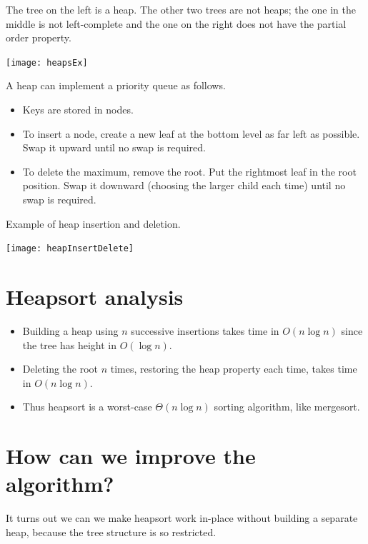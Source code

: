 \begin{Boxample}
The tree on the left is a heap. The other two trees are not heaps; 
the one in the middle is not left-complete and the one on the right does not have the partial order property.
\begin{center}
\texttt{[image: heapsEx]}
\end{center}
\end{Boxample}


A heap can implement a priority queue as follows. 
\begin{itemize}
\item Keys are stored in nodes. 
\item To insert a node, create a new leaf at the bottom level as far left as 
possible. Swap it upward until no swap is required. 
\item To delete the maximum, remove the root. Put the rightmost leaf in the root
 position. Swap it downward (choosing the larger child each time) until no swap 
is required. 
\end{itemize}

\begin{Boxample}
Example of heap insertion and deletion. 
\begin{center}
\texttt{[image: heapInsertDelete]}
\end{center}
\end{Boxample}

\section{Heapsort analysis}
\begin{itemize}
\item Building a heap using $n$ successive insertions takes time in 
$O(n\log n)$ since the tree has height in $O(\log n)$.
\item Deleting the root $n$ times, restoring the heap property each time, takes
 time in $O(n \log n)$.
\item Thus heapsort is a worst-case $\Theta(n \log n)$ sorting algorithm, like 
mergesort. 
\end{itemize}

\section{How can we improve the algorithm?}
It turns out we can we make heapsort work in-place without building a separate heap, because the tree structure is so restricted.

